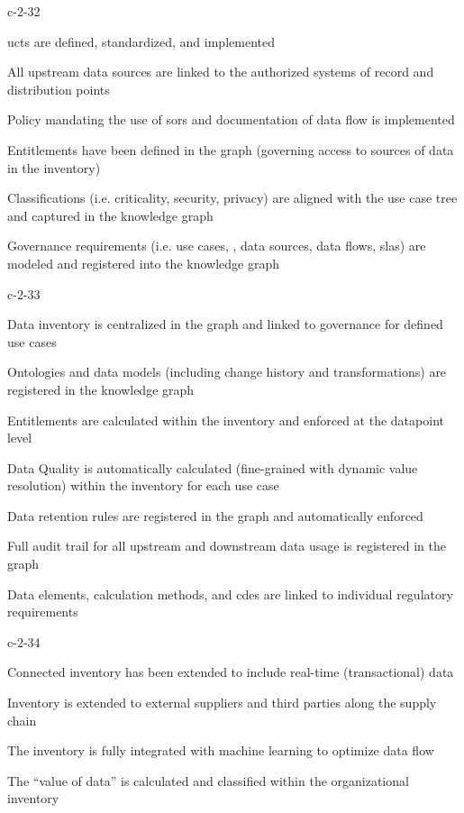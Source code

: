 \begin{level-assessment}{c-2-3}{2}

  \item \glspl{uct} are defined, standardized, and implemented
  \item All upstream data sources are linked to the authorized systems of record and distribution points
  \item Policy mandating the use of \glspl{sor} and documentation of data flow is implemented
  \item Entitlements have been defined in the graph (governing access to sources of data in the inventory)
  \item Classifications (i.e. criticality, security, privacy) are aligned with the use case tree and captured in the
        knowledge graph
  \item Governance requirements (i.e. use cases, , data sources, data flows, \glspl{sla})
        are modeled and registered into the knowledge graph

\end{level-assessment}

\begin{level-assessment}{c-2-3}{3}

  \item Data inventory is centralized in the graph and linked to governance for defined use cases
  \item Ontologies and data models (including change history and transformations) are registered in the knowledge graph
  \item Entitlements are calculated within the inventory and enforced at the datapoint level
  \item Data Quality is automatically calculated (fine-grained with dynamic value resolution) within
        the inventory for each use case
  \item Data retention rules are registered in the graph and automatically enforced
  \item Full audit trail for all upstream and downstream data usage is registered in the graph
  \item Data elements, calculation methods, and \glspl{cde} are linked to individual regulatory requirements

\end{level-assessment}

\begin{level-assessment}{c-2-3}{4}

  \item Connected inventory has been extended to include real-time (transactional) data
  \item Inventory is extended to external suppliers and third parties along the supply chain
  \item The inventory is fully integrated with machine learning to optimize data flow
  \item The “value of data” is calculated and classified within the organizational inventory

\end{level-assessment}

